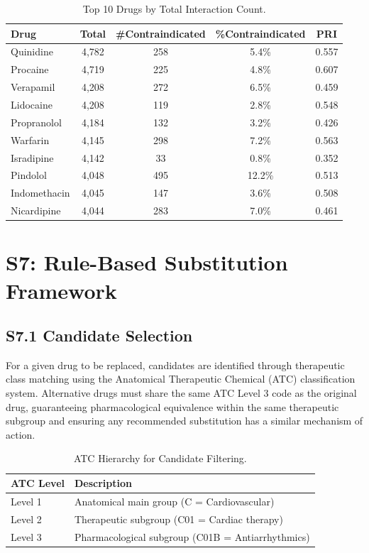\documentclass[12pt,a4paper]{article}
\begin{document}
\begin{table}[H]
\centering
\caption{Top 10 Drugs by Total Interaction Count.}
\label{tab:top10_drugs}
\begin{tabular}{@{}lcccc@{}}
\toprule
\textbf{Drug} & \textbf{Total} & \textbf{\#Contraindicated} & \textbf{\%Contraindicated} & \textbf{PRI} \\
\midrule
Quinidine & 4,782 & 258 & 5.4\% & 0.557 \\
Procaine & 4,719 & 225 & 4.8\% & 0.607 \\
Verapamil & 4,208 & 272 & 6.5\% & 0.459 \\
Lidocaine & 4,208 & 119 & 2.8\% & 0.548 \\
Propranolol & 4,184 & 132 & 3.2\% & 0.426 \\
Warfarin & 4,145 & 298 & 7.2\% & 0.563 \\
Isradipine & 4,142 & 33 & 0.8\% & 0.352 \\
Pindolol & 4,048 & 495 & 12.2\% & 0.513 \\
Indomethacin & 4,045 & 147 & 3.6\% & 0.508 \\
Nicardipine & 4,044 & 283 & 7.0\% & 0.461 \\
\bottomrule
\end{tabular}
\end{table}

\section{S7: Rule-Based Substitution Framework}
\label{sec:s7}

\subsection{S7.1 Candidate Selection}

For a given drug to be replaced, candidates are identified through therapeutic class matching using the Anatomical Therapeutic Chemical (ATC) classification system. Alternative drugs must share the same ATC Level 3 code as the original drug, guaranteeing pharmacological equivalence within the same therapeutic subgroup and ensuring any recommended substitution has a similar mechanism of action.

\begin{table}[H]
\centering
\caption{ATC Hierarchy for Candidate Filtering.}
\label{tab:atc_hierarchy}
\begin{tabular}{@{}ll@{}}
\toprule
\textbf{ATC Level} & \textbf{Description} \\
\midrule
Level 1 & Anatomical main group (C = Cardiovascular) \\
Level 2 & Therapeutic subgroup (C01 = Cardiac therapy) \\
Level 3 & Pharmacological subgroup (C01B = Antiarrhythmics) \\
\bottomrule
\end{tabular}
\end{table}
\end{document}
